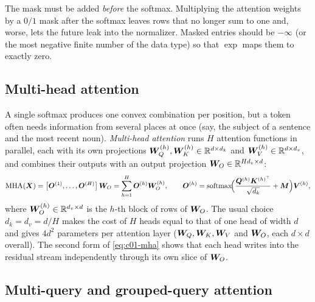 \begin{pitfall}
The mask must be added \emph{before} the softmax. Multiplying the attention weights by a
$0/1$ mask after the softmax leaves rows that no longer sum to one and, worse, lets the
future leak into the normalizer. Masked entries should be $-\infty$ (or the most negative
finite number of the data type) so that $\exp$ maps them to exactly zero.
\end{pitfall}

\subsection{Multi-head attention}\label{sec:c01-mha}

A single softmax produces one convex combination per position, but a token often needs
information from several places at once (say, the subject of a sentence and the most recent
noun). \emph{Multi-head attention} runs $H$ attention functions in parallel, each with its own
projections $\bm{W}_Q^{(h)}, \bm{W}_K^{(h)} \in \mathbb{R}^{d \times d_k}$ and $\bm{W}_V^{(h)} \in \mathbb{R}^{d\times
d_v}$, and combines their outputs with an output projection
$\bm{W}_O \in \mathbb{R}^{H d_v \times d}$:
\begin{equation}\label{eq:c01-mha}
  \mathrm{MHA}(\bm{X}) = \bigl[\bm{O}^{(1)}, \dots, \bm{O}^{(H)}\bigr]\,\bm{W}_O
  = \sum_{h=1}^{H} \bm{O}^{(h)}\bm{W}_O^{(h)},
  \qquad
  \bm{O}^{(h)} = \operatorname{softmax}\!\Bigl(\frac{\bm{Q}^{(h)}\bm{K}^{(h)^{\top}}}{\sqrt{d_k}} + \bm{M}\Bigr)\bm{V}^{(h)},
\end{equation}
where $\bm{W}_O^{(h)} \in \mathbb{R}^{d_v \times d}$ is the $h$-th block of rows of $\bm{W}_O$. The usual
choice $d_k = d_v = d/H$ makes the cost of $H$ heads equal to that of one head of width $d$
and gives $4d^2$ parameters per attention layer ($\bm{W}_Q, \bm{W}_K, \bm{W}_V$ and $\bm{W}_O$, each
$d \times d$ overall). The second form of \eqref{eq:c01-mha} shows that each head writes into
the residual stream independently through its own slice of $\bm{W}_O$.

\subsection{Multi-query and grouped-query attention}\label{sec:c01-gqa}

